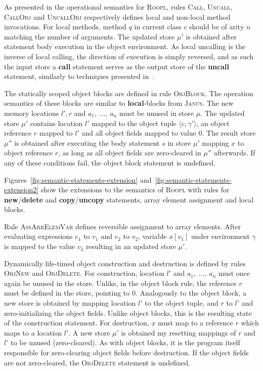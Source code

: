 As presented in the operational semantics for \textsc{Roopl}, rules \textsc{Call}, \textsc{Uncall}, \textsc{CallObj} and \textsc{UncallObj} respectively defines local and non-local method invocations. For local methods, method $q$ in current class $c$ should be of arity $n$ matching the number of arguments. The updated store $\mu'$ is obtained after statement body execution in the object environment. As local uncalling is the inverse of local calling, the direction of execution is simply reversed, and as such the input store a \textbf{call} statement serves as the output store of the \textbf{uncall} statement, similarly to techniques presented in~\cite{ty:janus, ty:ejanus}.

The statically scoped object blocks are defined in rule \textsc{ObjBlock}. The operation semantics of these blocks are similar to \textbf{local}-blocks from \textsc{Janus}. The new memory locations $l', r$ and $a_1,\ ...,\ a_n$ must be unused in store $\mu$. The updated store $\mu'$ contains location $l'$ mapped to the object tuple $\langle c, \gamma' \rangle$, an object reference $r$ mapped to $l'$ and all object fields mapped to value $0$. The result store $\mu''$ is obtained after executing the body statement $s$ in store $\mu'$ mapping $x$ to object reference $r$, as long as all object fields are zero-cleared in $\mu''$ afterwards. If any of these conditions fail, the object block statement is undefined.

Figures~\ref{fig:semantic-statements-extension} and~\ref{fig:semantic-statements-extension2} show the extensions to the semantics of \textsc{Roopl} with rules for \textbf{new}/\textbf{delete} and \textbf{copy}/\textbf{uncopy} statements, array element assignment and local blocks.

Rule \textsc{AssArrElemVar} defines reversible assignment to array elements. After evaluating expressions $e_1$ to $v_1$ and $e_2$ to $v_2$, variable $x[v_1]$ under environment $\gamma$ is mapped to the value $v_3$ resulting in an updated store $\mu'$.

Dynamically life-timed object construction and destruction is defined by rules \textsc{ObjNew} and \textsc{ObjDelete}. For construction, location $l'$ and $a_1,\ ...,\ a_n$ must once again be unused in the store. Unlike, in the object block rule, the reference $r$ must be defined in the store, pointing to $0$. Analogously to the object block, a new store is obtained by mapping location $l'$ to the object tuple, and $r$ to $l'$ and zero-initializing the object fields. Unlike object blocks, this is the resulting state of the construction statement. For destruction, $x$ must map to a reference $r$ which maps to a location $l'$. A new store $\mu'$ is obtained my resetting mappings of $r$ and $l'$ to be unused (zero-cleared). As with object blocks, it is the program itself responsible for zero-clearing object fields before destruction. If the object fields are not zero-cleared, the \textsc{ObjDelete} statement is undefined.

